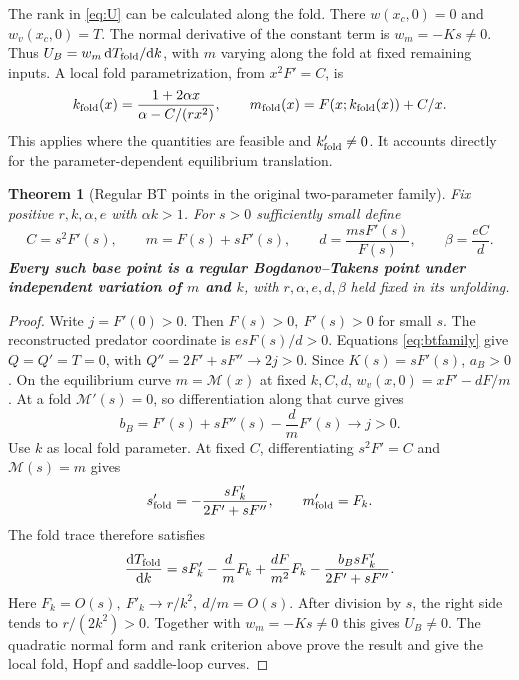 \documentclass[12pt,a4paper,twoside,fleqn]{article}
\theoremstyle{journal}
\newtheorem{theorem}{Theorem}
\newcommand{\claim}[1]{{\normalfont\bfseries\boldmath #1}}
\newcommand{\dd}{\mathrm{d}}
\begin{document}
The rank in \eqref{eq:U} can be calculated along the fold. There \(w(x_c,0)=0\) and \(w_v(x_c,0)=T\). The normal derivative of the constant term is \(w_m=-Ks\ne0\). Thus \(U_B=w_m\,\dd T_{\rm fold}/\dd k\), with \(m\) varying along the fold at fixed remaining inputs. A local fold parametrization, from \(x^2F'=C\), is
\[
 k_{\rm fold}(x)=\frac{1+2\alpha x}{\alpha-C/(rx^2)},\qquad
 m_{\rm fold}(x)=F(x;k_{\rm fold}(x))+C/x .
\]
This applies where the quantities are feasible and \(k'_{\rm fold}\ne0\). It accounts directly for the parameter-dependent equilibrium translation.

\begin{theorem}[Regular BT points in the original two-parameter family]\label{thm:bt}
Fix positive \(r,k,\alpha,e\) with \(\alpha k>1\). For \(s>0\) sufficiently small define
\begin{equation}\label{eq:btfamily}
 C=s^2F'(s),\qquad
 m=F(s)+sF'(s),\qquad d=\frac{m sF'(s)}{F(s)},\qquad \beta=\frac{eC}{d}.
\end{equation}
\claim{Every such base point is a regular Bogdanov--Takens point under independent variation of \(m\) and \(k\)}, with \(r,\alpha,e,d,\beta\) held fixed in its unfolding.
\end{theorem}
\begin{proof}
Write \(j=F'(0)>0\). Then \(F(s)>0,\ F'(s)>0\) for small \(s\). The reconstructed predator coordinate is \(esF(s)/d>0\). Equations \eqref{eq:btfamily} give \(Q=Q'=T=0\), with \(Q''=2F'+sF''\to 2j>0\). Since \(K(s)=sF'(s)\), \(a_B>0\). On the equilibrium curve \(m=\mathcal M(x)\) at fixed \(k,C,d\), \(w_v(x,0)=xF'-dF/m\). At a fold \(\mathcal M'(s)=0\), so differentiation along that curve gives
\[
 b_B=F'(s)+sF''(s)-\frac d m F'(s)\longrightarrow j>0 .
\]
Use \(k\) as local fold parameter. At fixed \(C\), differentiating \(s^2F'=C\) and \(\mathcal M(s)=m\) gives
\[
 s'_{\rm fold}=-\frac{s F'_k}{2F'+sF''},\qquad
 m'_{\rm fold}=F_k .
\]
The fold trace therefore satisfies
\[
 \frac{\dd T_{\rm fold}}{\dd k}
 =sF'_k-\frac d m F_k+\frac{dF}{m^2}F_k
     -\frac{b_Bs F'_k}{2F'+sF''}.
\]
Here \(F_k=O(s),\ F'_k\to r/k^2,\ d/m=O(s)\). After division by \(s\), the right side tends to \(r/(2k^2)>0\). Together with \(w_m=-Ks\ne0\) this gives \(U_B\ne0\). The quadratic normal form and rank criterion above prove the result and give the local fold, Hopf and saddle-loop curves.
\end{proof}
\end{document}
